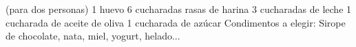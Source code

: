 (para dos personas)
1 huevo
6 cucharadas rasas de harina
3 cucharadas de leche
1 cucharada de aceite de oliva
1 cucharada de azúcar
Condimentos a elegir: Sirope de chocolate, nata, miel, yogurt, helado...
